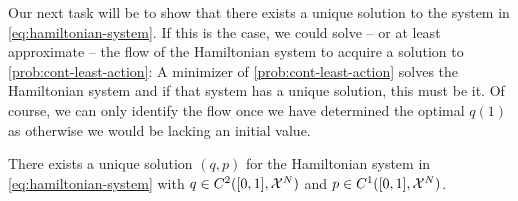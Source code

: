 Our next task will be to show that there exists a unique solution to the system in \cref{eq:hamiltonian-system}.
If this is the case, we could solve -- or at least approximate -- the flow of the Hamiltonian system to acquire a solution to \cref{prob:cont-least-action}:
A minimizer of \cref{prob:cont-least-action} solves the Hamiltonian system and if that system has a unique solution, this must be it.
Of course, we can only identify the flow once we have determined the optimal $q(1)$ as otherwise we would be lacking an initial value.

\begin{theorem}
	There exists a unique solution $(q, p)$ for the Hamiltonian system in \cref{eq:hamiltonian-system} with $q \in C^2([0, 1], \mathcal{X}^N)$ and $p \in C^1([0, 1], \mathcal{X}^N)$.
\end{theorem}


